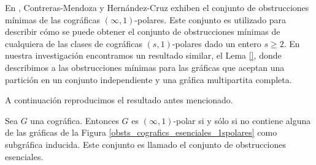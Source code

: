En \cite{Fernando}, Contreras-Mendoza y Hern\'andez-Cruz
exhiben el conjunto de obstrucciones mínimas de las
cográficas $(\infty, 1)$-polares. Este conjunto es
utilizado para describir cómo se puede obtener el conjunto
de obstrucciones mínimas de cualquiera de las clases de
cográficas $(s,1)$-polares dado un entero $s \ge 2$. En
nuestra investigación encontramos un resultado similar,
el Lema \ref{}, donde describimos a las obstrucciones
m\'inimas para las gráficas que aceptan una partición en
un conjunto independiente y una gráfica multipartita completa.

A continuaci\'on reproducimos el resultado antes mencionado.

\begin{theorem}
\label{thm:s,1-ess}
  Sea $G$ una cográfica. Entonces $G$ es $(\infty,1)$-polar
  si y sólo si no contiene alguna de las gráficas de la Figura
  \ref{obsts_cografics_esenciales_1spolares} como subgráfica
  inducida. Este conjunto es llamado el conjunto de obstrucciones
  esenciales.
\end{theorem}

